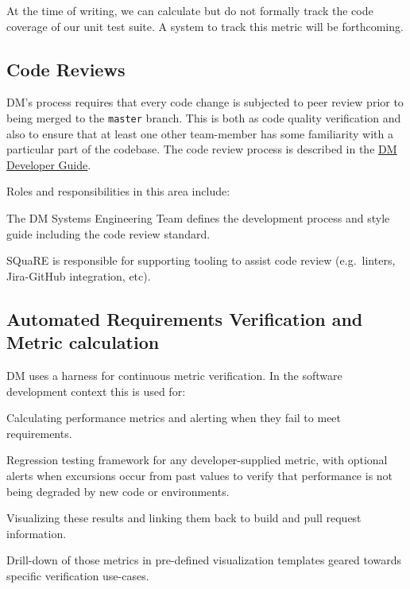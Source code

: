 At the time of writing, we can calculate but do not formally track the code coverage of our unit test suite.
A system to track this metric will be forthcoming.

\subsection{Code Reviews}

DM’s process requires that every code change is subjected to peer review prior to being merged to the \texttt{master} branch.
This is both as code quality verification and also to ensure that at least one other team-member has some familiarity with a particular part of the codebase.
The code review process is described in the \href{https://developer.lsst.io/work/flow.html#review-preparation}{DM Developer Guide}.

Roles and responsibilities in this area include:

\begin{itemize_single}

\item{The DM Systems Engineering Team defines the development process and style guide including the code review standard.}

\item{SQuaRE is responsible for supporting tooling to assist code review (e.g.\ linters, Jira-GitHub integration, etc).}

\end{itemize_single}

\subsection{Automated Requirements Verification and Metric calculation}

DM uses a harness for continuous metric verification.
In the software development context this is used for:

\begin{itemize_single}

\item Calculating performance metrics and alerting when they fail to meet requirements.

\item Regression testing framework for any developer-supplied metric, with optional alerts when excursions occur from past values to verify that performance is not being degraded by new code or environments.

\item Visualizing these results and linking them back to build and pull request information.

\item Drill-down of those metrics in pre-defined visualization templates geared towards specific verification use-cases.

\end{itemize_single}

